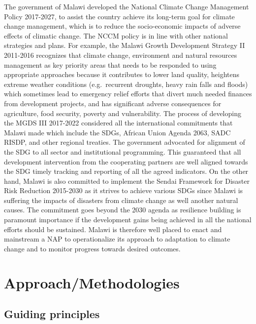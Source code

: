 \documentclass[
]{book}
\begin{document}
The government of Malawi developed the National Climate Change Management Policy 2017-2027, to assist the country achieve its long-term goal for climate change management, which is to reduce the socio-economic impacts of adverse effects of climatic change. The NCCM policy is in line with other national strategies and plans. For example, the Malawi Growth Development Strategy II 2011-2016 recognizes that climate change, environment and natural resources management as key priority areas that needs to be responded to using appropriate approaches because it contributes to lower land quality, heightens extreme weather conditions (e.g.~recurrent droughts, heavy rain falls and floods) which sometimes lead to emergency relief efforts that divert much needed finances from development projects, and has significant adverse consequences for agriculture, food security, poverty and vulnerability. The process of developing the MGDS III 2017-2022 considered all the international commitments that Malawi made which include the SDGs, African Union Agenda 2063, SADC RISDP, and other regional treaties. The government advocated for alignment of the SDG to all sector and institutional programming. This guaranteed that all development intervention from the cooperating partners are well aligned towards the SDG timely tracking and reporting of all the agreed indicators. On the other hand, Malawi is also committed to implement the Sendai Framework for Disaster Risk Reduction 2015-2030 as it strives to achieve various SDGs since Malawi is suffering the impacts of disasters from climate change as well another natural causes. The commitment goes beyond the 2030 agenda as resilience building is paramount importance if the development gains being achieved in all the national efforts should be sustained. Malawi is therefore well placed to enact and mainstream a NAP to operationalize its approach to adaptation to climate change and to monitor progress towards desired outcomes.

\hypertarget{approachmethodologies}{%
\chapter{Approach/Methodologies}\label{approachmethodologies}}

\hypertarget{guiding-principles}{%
\section{Guiding principles}\label{guiding-principles}}
\end{document}
